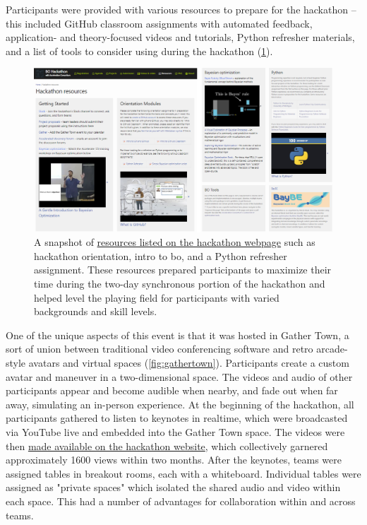 \documentclass[superscriptaddress, nofootinbib,  amsmath, amssymb, twocolumn]{revtex4-2} %
\begin{document}
Participants were provided with various resources to prepare for the hackathon – this included GitHub classroom assignments with automated feedback, application- and theory-focused videos and tutorials, Python refresher materials, and a list of tools to consider using during the hackathon (\cref{fig:preparation}).

\begin{figure}
    \centering
    \includegraphics[width=0.98\linewidth]{latex/figures/preparation.png}
    \caption{A snapshot of \href{https://ac-bo-hackathon.github.io/resources/}{resources listed on the hackathon webpage} such as hackathon orientation, intro to \gls{bo}, and a Python refresher assignment. These resources prepared participants to maximize their time during the two-day synchronous portion of the hackathon and helped level the playing field for participants with varied backgrounds and skill levels.}
    \label{fig:preparation}
\end{figure}

One of the unique aspects of this event is that it was hosted in Gather Town, a sort of union between traditional video conferencing software and retro arcade-style avatars and virtual spaces (\cref{fig:gathertown}). Participants create a custom avatar and maneuver in a two-dimensional space. The videos and audio of other participants appear and become audible when nearby, and fade out when far away, simulating an in-person experience. At the beginning of the hackathon, all participants gathered to listen to keynotes in realtime, which were broadcasted via YouTube live and embedded into the Gather Town space. The videos were then \href{https://ac-bo-hackathon.github.io/videos-slides/}{made available on the hackathon website}, which collectively garnered approximately 1600 views within two months. After the keynotes, teams were assigned tables in breakout rooms, each with a whiteboard. Individual tables were assigned as "private spaces" which isolated the shared audio and video within each space. This had a number of advantages for collaboration within and across teams.
\end{document}
